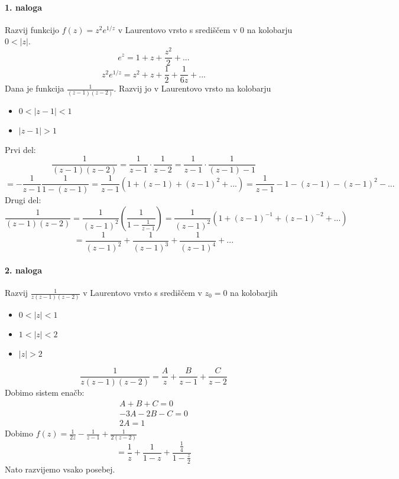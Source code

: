 \documentclass[a4paper]{article}
\begin{document}
\paragraph{1. naloga} Razvij funkcijo $f(z) = z^2e^{1/z}$ v Laurentovo vrsto s središčem v 0 na kolobarju $0<|z|$.
$$e^z = 1 + z + \frac{z^2}{2} + ...$$
$$z^2e^{1/z} = z^2 + z + \frac{1}{2} + \frac{1}{6z} + ...$$
Dana je funkcija $\displaystyle{\frac{1}{(z-1)(z-2)}}$. Razvij jo v Laurentovo vrsto na kolobarju
\begin{itemize}
    \item $0<|z-1|<1$
    \item $|z-1|>1$
\end{itemize}
Prvi del:
$$\frac{1}{(z-1)(z-2)}=\frac{1}{z-1}\cdot\frac{1}{z-2}=\frac{1}{z-1}\cdot\frac{1}{(z-1)-1}$$
$$=-\frac{1}{z-1}\frac{1}{1-(z-1)}=\frac{1}{z-1}\left(1+(z-1)+(z-1)^2+...\right)=\frac{1}{z-1}-1-(z-1)-(z-1)^2-...$$
Drugi del:
$$\frac{1}{(z-1)(z-2)}=\frac{1}{(z-1)^2}\left(\frac{1}{1-\frac{1}{z-1}}\right)=\frac{1}{(z-1)^2}\left(1+(z-1)^{-1}+(z-1)^{-2}+...\right)$$
$$=\frac{1}{(z-1)^2}+\frac{1}{(z-1)^3}+\frac{1}{(z-1)^4}+...$$
\paragraph{2. naloga} Razvij $\displaystyle{\frac{1}{z(z-1)(z-2)}}$ v Laurentovo vrsto s središčem v $z_0=0$ na kolobarjih
\begin{itemize}
    \item $0 < |z| < 1$
    \item $1 < |z| < 2$
    \item $|z| > 2$
\end{itemize}
$$\frac{1}{z(z-1)(z-2)} = \frac{A}{z} + \frac{B}{z-1} + \frac{C}{z-2}$$
Dobimo sistem enačb:
\begin{eqnarray*}
    A + B + C = 0 \\
    -3A -2B - C = 0 \\
    2A = 1
\end{eqnarray*}
Dobimo $\displaystyle{f(z) = \frac{1}{2z} - \frac{1}{z-1} + \frac{1}{2(z-2)}}$
$$= \frac{1}{z} + \frac{1}{1-z} + \frac{\frac{1}{4}}{1 - \frac{z}{2}}$$
Nato razvijemo vsako posebej.
\end{document}
